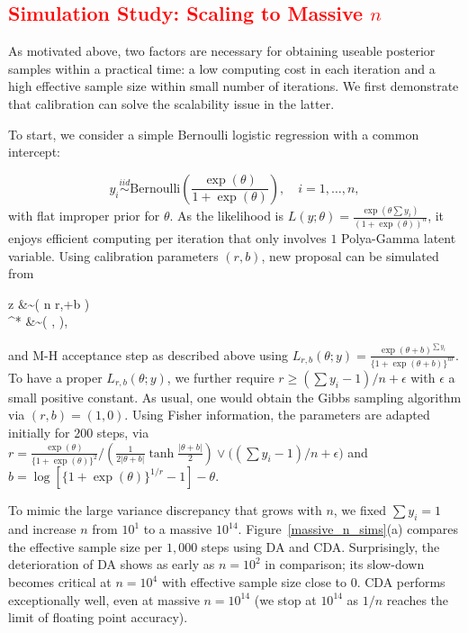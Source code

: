 \documentclass[11pt]{article}
\newcommand{\leo}[1]{{\textcolor{red}{#1}}}
\newcommand{\be}{\begin{equs}}
\newcommand{\ee}{\end{equs}}
\newcommand{\No}{\text{No}}
\newcommand{\PG}{\text{PG}}
\newcommand{\Bern}{\text{Bernoulli}}
\begin{document}
\leo{
\section{Simulation Study: Scaling to Massive $n$}
}

As motivated above,  two factors are necessary for obtaining useable posterior samples within a practical  time: a low computing cost  in each iteration
and a high effective sample size within small number of iterations. We first demonstrate that calibration can solve the scalability issue
in the latter.


To start, we consider a simple Bernoulli logistic regression with a common
intercept:

$$y_i\stackrel{iid}{\sim} \Bern(\frac{\exp(\theta)}{1+\exp(\theta)}), \quad i=1,\ldots,n,$$
with flat improper prior for $\theta$. As the likelihood is $L(y;\theta )= \frac{\exp(\theta\sum y_i)}{(1+\exp(\theta))^n} $, it enjoys efficient computing per iteration
that only involves $1$  Polya-Gamma latent variable. Using calibration parameters $(r,b)$, new proposal can be simulated from


\be
z &\sim \PG\left ( n r,\theta+b \right)\\
\theta^* &\sim \No \left( , \right),
\ee
and M-H acceptance step as described above using $L_{r,b}(\theta; y) = \frac{\exp(\theta+b)^{\sum y_i}}{\{ 1+\exp(\theta+b)\}^{nr}}$.
To have a proper $L_{r,b}(\theta;y)$, we further require $r \ge (\sum y_i-1)/n + \epsilon$ with $\epsilon$ a small positive constant. As usual, one would obtain the  Gibbs sampling algorithm \citep{polson2013bayesian}
via $(r,b)=(1,0)$. 
 Using Fisher information, the  parameters are adapted initially for $200$
 steps, via $r =\frac{\exp(\theta)}{ \{1+\exp(\theta)\} ^2} / \left (   \frac{1}{2 |\theta+b|} \tanh\frac{|\theta+b|}{2} \right) \vee \big ( (\sum y_i-1)/n + \epsilon \big)$ and $b=\log[  \{1+\exp(\theta)\}^{1/r} -1] - \theta$.

To mimic the large variance discrepancy that grows with $n$, we fixed $\sum
y_i=1$ and increase $n$ from $10^1$ to a massive $10^{14}$. 
Figure~\ref{massive_n_sims}(a) compares the effective sample size per $1,000$
steps using DA and CDA. Surprisingly, the deterioration of DA shows as early
as $n=10^2$ in comparison; its slow-down becomes critical at $n=10^4$ with
effective sample size close to $0$. CDA performs exceptionally well, even
at massive $n=10^{14}$ (we stop at $10^{14}$ as $1/n$ reaches the limit of floating
point accuracy).
\end{document}
